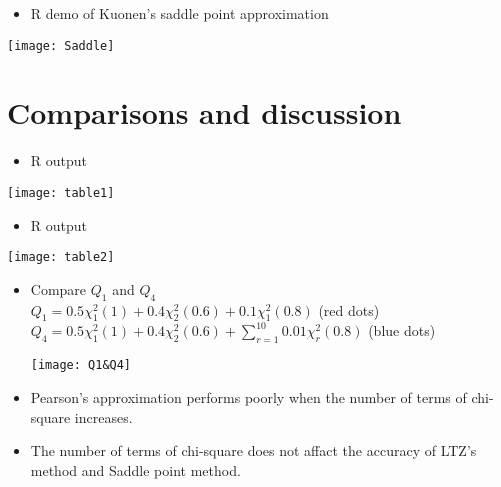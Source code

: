 \documentclass[10pt]{beamer}
\begin{document}
\begin{frame}
	\begin{itemize}
		\item R demo of Kuonen's saddle point approximation
	\end{itemize}
	\graphicspath{{C:/Users/riyi/Desktop/yusha/fall2015-sha/STAT-5123/project}}
	\texttt{[image: Saddle]}
\end{frame}

\section{Comparisons and discussion}

\begin{frame}
	\begin{itemize}
		\item R output
	\end{itemize}
	\graphicspath{{C:/Users/riyi/Desktop/yusha/fall2015-sha/STAT-5123/project}}
	\texttt{[image: table1]}
\end{frame}

\begin{frame}
	\begin{itemize}
		\item R output
	\end{itemize}
	\graphicspath{{C:/Users/riyi/Desktop/yusha/fall2015-sha/STAT-5123/project}}
	\texttt{[image: table2]}
\end{frame}

\begin{frame}
	\begin{itemize}
	\item Compare $Q_1$ and $Q_4$\\	
		\scriptsize
		$Q_1=	0.5\chi_1^2(1)+0.4\chi_2^2(0.6)+0.1\chi_1^2(0.8)$   (red dots)\\
		$Q_4= 0.5\chi_1^2(1)+0.4\chi_2^2(0.6)+\sum_{r=1}^{10}0.01\chi_r^2(0.8)$    (blue dots)	
	\graphicspath{{C:/Users/riyi/Desktop/yusha/fall2015-sha/STAT-5123/project}}
	\texttt{[image: Q1\&Q4]}
	\footnotesize
	\item Pearson's approximation performs poorly when the number of terms of chi-square increases.\\
	\item The number of terms of chi-square does not affact the accuracy of LTZ's method and Saddle point method.
		\end{itemize}
\end{frame}
\end{document}
